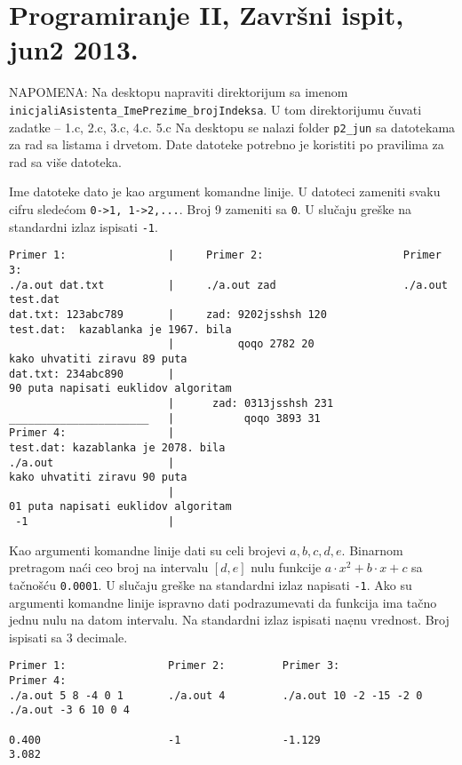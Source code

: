 \section{Programiranje II, Zavr\v{s}ni ispit, jun2 2013.}



NAPOMENA: Na desktopu napraviti direktorijum sa imenom \verb|inicjaliAsistenta_ImePrezime_brojIndeksa|.
U tom direktorijumu \v cuvati zadatke -- 1.c, 2.c, 3.c, 4.c. 5.c
Na desktopu se nalazi folder \verb|p2_jun| sa datotekama za rad sa listama i drvetom. Date datoteke potrebno je koristiti
po pravilima za rad sa vi\v se datoteka.

\begin{z}Ime datoteke dato je kao argument komandne linije. U datoteci zameniti svaku cifru slede\' com \verb|0->1, 1->2,...|.
Broj 9 zameniti sa \verb|0|. U slu\v caju gre\v ske na standardni izlaz ispisati \verb|-1|.
\end{z}
\begin{verbatim}
Primer 1:                |     Primer 2:                      Primer 3:
./a.out dat.txt          |     ./a.out zad                    ./a.out test.dat
dat.txt: 123abc789       |     zad: 9202jsshsh 120            test.dat:  kazablanka je 1967. bila
                         |          qoqo 2782 20                         kako uhvatiti ziravu 89 puta
dat.txt: 234abc890       |                                               90 puta napisati euklidov algoritam
                         |      zad: 0313jsshsh 231
______________________   |           qoqo 3893 31
Primer 4:                |                                    test.dat: kazablanka je 2078. bila
./a.out                  |                                              kako uhvatiti ziravu 90 puta
                         |                                              01 puta napisati euklidov algoritam
 -1                      |
\end{verbatim}

\begin{z} Kao argumenti komandne linije dati su celi brojevi $a, b, c, d, e$. Binarnom pretragom na\' ci ceo broj na intervalu $[d, e]$
nulu funkcije $a\cdot x^2 + b\cdot x + c$ sa ta\v cno\v s\'cu \verb|0.0001|. U slu\v caju gre\v ske na standardni izlaz napisati \verb|-1|.
Ako su argumenti komandne linije ispravno dati podrazumevati da funkcija ima ta\v cno jednu nulu na datom intervalu.
Na standardni izlaz ispisati na\d enu vrednost. Broj ispisati sa 3 decimale.
\end{z}
\begin{verbatim}
Primer 1:                Primer 2:         Primer 3:                     Primer 4:
./a.out 5 8 -4 0 1       ./a.out 4         ./a.out 10 -2 -15 -2 0        ./a.out -3 6 10 0 4

0.400                    -1                -1.129                        3.082
\end{verbatim}

